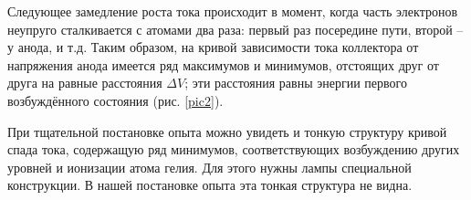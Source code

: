 Следующее замедление роста тока происходит в момент, когда часть электронов
неупруго сталкивается с атомами два раза: первый раз посередине пути, второй --
у анода, и т.д. Таким образом, на кривой зависимости тока коллектора от
напряжения анода имеется ряд максимумов и минимумов, отстоящих друг от друга на
равные расстояния $\Delta V$; эти расстояния равны энергии первого возбуждённого
состояния (рис. \ref{pic2}).

При тщательной постановке опыта можно увидеть и тонкую структуру кривой спада
тока, содержащую ряд минимумов, соответствующих возбуждению других уровней и
ионизации атома гелия. Для этого нужны лампы специальной конструкции. В нашей
постановке опыта эта тонкая структура не видна.